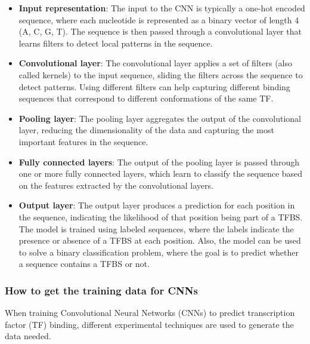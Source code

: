 \documentclass[a4paper]{article}
\begin{document}
\begin{itemize}
    \item \textbf{Input representation}: The input to the CNN is typically a one-hot
    encoded sequence, where each nucleotide is represented as a binary vector of
    length 4 (A, C, G, T). The sequence is then passed through a convolutional layer
    that learns filters to detect local patterns in the sequence.

    \item \textbf{Convolutional layer}: The convolutional layer applies a set of filters
    (also called kernels) to the input sequence, sliding the filters across the
    sequence to detect patterns. Using different filters can help capturing
    different binding sequences that correspond to different conformations of the
    same TF.

    \item \textbf{Pooling layer}: The pooling layer aggregates the output of the
    convolutional layer, reducing the dimensionality of the data and capturing
    the most important features in the sequence.

    \item \textbf{Fully connected layers}: The output of the pooling layer is passed
    through one or more fully connected layers, which learn to classify the sequence
    based on the features extracted by the convolutional layers.

    \item \textbf{Output layer}: The output layer produces a prediction for each
    position in the sequence, indicating the likelihood of that position being part
    of a TFBS. The model is trained using labeled sequences, where the labels indicate
    the presence or absence of a TFBS at each position. Also, the model can be used
    to solve a binary classification problem, where the goal is to predict whether
    a sequence contains a TFBS or not.

\end{itemize}

\subsubsection*{How to get the training data for CNNs}

When training Convolutional Neural Networks (CNNs) to predict transcription 
factor (TF) binding, different experimental techniques are used to generate 
the data needed. 
\end{document}
